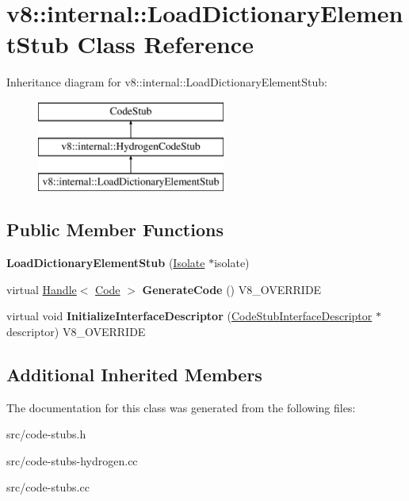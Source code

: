 \hypertarget{classv8_1_1internal_1_1_load_dictionary_element_stub}{}\section{v8\+:\+:internal\+:\+:Load\+Dictionary\+Element\+Stub Class Reference}
\label{classv8_1_1internal_1_1_load_dictionary_element_stub}
Inheritance diagram for v8\+:\+:internal\+:\+:Load\+Dictionary\+Element\+Stub\+:\begin{figure}[H]
\begin{center}
\leavevmode
\includegraphics[height=3.000000cm]{classv8_1_1internal_1_1_load_dictionary_element_stub}
\end{center}
\end{figure}
\subsection*{Public Member Functions}
\begin{DoxyCompactItemize}
\item 
\hypertarget{classv8_1_1internal_1_1_load_dictionary_element_stub_ac1ad884afa1fadf613e9964596fb3d68}{}{\bfseries Load\+Dictionary\+Element\+Stub} (\hyperlink{classv8_1_1internal_1_1_isolate}{Isolate} $\ast$isolate)\label{classv8_1_1internal_1_1_load_dictionary_element_stub_ac1ad884afa1fadf613e9964596fb3d68}

\item 
\hypertarget{classv8_1_1internal_1_1_load_dictionary_element_stub_a90a59ee24adbfd47dd03909a2ec618b0}{}virtual \hyperlink{classv8_1_1internal_1_1_handle}{Handle}$<$ \hyperlink{classv8_1_1internal_1_1_code}{Code} $>$ {\bfseries Generate\+Code} () V8\+\_\+\+O\+V\+E\+R\+R\+I\+D\+E\label{classv8_1_1internal_1_1_load_dictionary_element_stub_a90a59ee24adbfd47dd03909a2ec618b0}

\item 
\hypertarget{classv8_1_1internal_1_1_load_dictionary_element_stub_a69b5116cdde0e341cc45d75c15fe912c}{}virtual void {\bfseries Initialize\+Interface\+Descriptor} (\hyperlink{classv8_1_1internal_1_1_code_stub_interface_descriptor}{Code\+Stub\+Interface\+Descriptor} $\ast$descriptor) V8\+\_\+\+O\+V\+E\+R\+R\+I\+D\+E\label{classv8_1_1internal_1_1_load_dictionary_element_stub_a69b5116cdde0e341cc45d75c15fe912c}

\end{DoxyCompactItemize}
\subsection*{Additional Inherited Members}


The documentation for this class was generated from the following files\+:\begin{DoxyCompactItemize}
\item 
src/code-\/stubs.\+h\item 
src/code-\/stubs-\/hydrogen.\+cc\item 
src/code-\/stubs.\+cc\end{DoxyCompactItemize}
